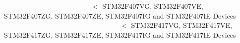 ~\newline
~\newline
~\newline
~\newline
~\newline
~\newline
~\newline
~\newline
~\newline
~\newline
~\newline
~\newline
~\newline
~\newline
~\newline
 $<$ S\+T\+M32\+F407\+VG, S\+T\+M32\+F407\+VE, S\+T\+M32\+F407\+ZG, S\+T\+M32\+F407\+ZE, S\+T\+M32\+F407\+IG and S\+T\+M32\+F407\+IE Devices ~\newline
~\newline
~\newline
~\newline
~\newline
~\newline
~\newline
~\newline
~\newline
~\newline
~\newline
~\newline
~\newline
~\newline
~\newline
~\newline
~\newline
~\newline
~\newline
~\newline
~\newline
~\newline
~\newline
 $<$ S\+T\+M32\+F417\+VG, S\+T\+M32\+F417\+VE, S\+T\+M32\+F417\+ZG, S\+T\+M32\+F417\+ZE, S\+T\+M32\+F417\+IG and S\+T\+M32\+F417\+IE Devices ~\newline
~\newline
~\newline
~\newline
~\newline
~\newline
~\newline
~\newline
~\newline
